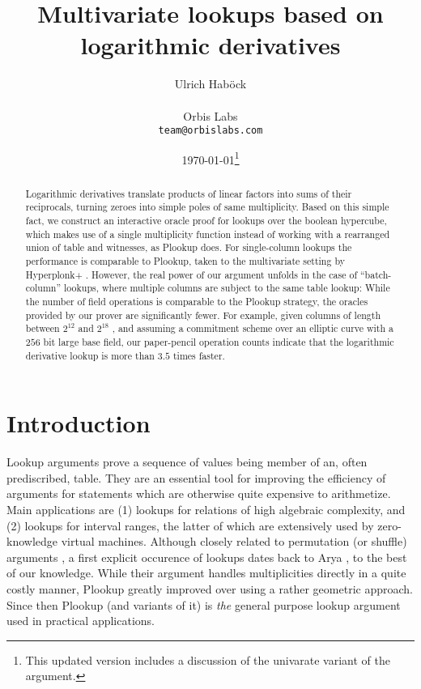 \documentclass[11pt]{article}
\author{%
Ulrich Hab{\"o}ck
\\\\
Orbis Labs
\\
\texttt{team@orbislabs.com}
}
\theoremstyle{definition}
\theoremstyle{definition}
\begin{document}
\title{%
Multivariate lookups based on
logarithmic derivatives
}
\date{%
\today\footnote{%
This updated version includes a discussion of the univarate variant of the argument.
}
}
\maketitle

\begin{abstract}
Logarithmic derivatives translate products of linear factors into sums of their reciprocals, turning zeroes into simple poles of same multiplicity.
Based on this simple fact, we construct an interactive oracle proof for lookups over the boolean hypercube, which makes use of a single multiplicity function instead of working with a rearranged union of table and witnesses, as Plookup \cite{Plookup} does.
For single-column lookups the performance is comparable to Plookup, taken to the multivariate setting by Hyperplonk+ \cite{Hyperplonk}.
However, the real power of our argument unfolds in the case of ``batch-column'' lookups, where multiple columns are subject to the same table lookup:  
While the number of field operations is comparable to the Plookup strategy, the oracles provided by our prover are significantly fewer. 
For example, given columns of length between $2^{12}$ and $2^{18}$ , and assuming a commitment scheme over an elliptic curve with a $256$ bit large base field, our paper-pencil operation counts indicate that the logarithmic derivative lookup is more than $3.5$ times faster.
\end{abstract}


\tableofcontents

\section{Introduction}

Lookup arguments prove a sequence of values being member of an, often prediscribed, table.
They are an essential tool for improving the efficiency of arguments for statements which are otherwise quite expensive to arithmetize. 
Main applications are (1) lookups for relations of high algebraic complexity, and (2) lookups for interval ranges, the latter of which are extensively used by zero-knowledge virtual machines.
Although closely related to permutation (or shuffle) arguments \cite{shuffle}, a first explicit occurence of lookups dates back to Arya \cite{Arya}, to the best of our knowledge.
While their argument handles multiplicities directly in a quite costly manner, Plookup \cite{Plookup} greatly improved over \cite{Arya} using a rather geometric approach.
Since then Plookup (and variants of it) is \textit{the} general purpose lookup argument used in practical applications. 
\end{document}
